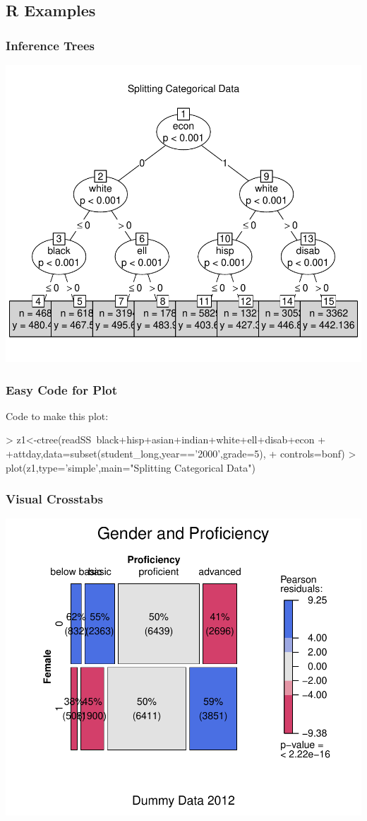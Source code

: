 \documentclass{beamer}
\begin{document}
\subsection{R Examples}
\label{sec: rexamp}

\begin{frame}
\frametitle{Inference Trees}
\begin{center}
\vspace{-.1in}
\includegraphics[width=.8\textwidth]{classtree}
\end{center}
\end{frame}

\begin{frame}[containsverbatim]
\frametitle{Easy Code for Plot}
Code to make this plot:
\vspace{.1in}
\begin{Schunk}
\begin{Sinput}
> z1<-ctree(readSS~black+hisp+asian+indian+white+ell+disab+econ
+           +attday,data=subset(student_long,year=='2000',grade=5),
+           controls=bonf)
> plot(z1,type='simple',main="Splitting Categorical Data")
\end{Sinput}
\end{Schunk}
\end{frame}


\begin{frame}
\frametitle{Visual Crosstabs}
\vspace{.1in}
\includegraphics[width=.85\textwidth]{crosstab2}
\end{frame}
\end{document}
